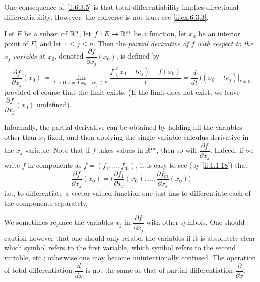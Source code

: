 \begin{rmk}\label{ii:6.3.6}
  One consequence of \cref{ii:6.3.5} is that total differentiability implies directional differentiability.
  However, the converse is not true;
  see \cref{ii:ex:6.3.3}.
\end{rmk}

\begin{defn}\label{ii:6.3.7}
  Let \(E\) be a subset of \(\mathbb{R}^n\), let \(f : E \to \mathbb{R}^m\) be a function, let \(x_0\) be an interior point of \(E\), and let \(1 \leq j \leq n\).
  Then the \emph{partial derivative of \(f\) with respect to the \(x_j\) variable} at \(x_0\), denoted \(\dfrac{\partial f}{\partial x_j}(x_0)\), is defined by
  \[
    \dfrac{\partial f}{\partial x_j}(x_0) \coloneqq \lim_{t \to 0 ; t \neq 0, x_0 + t e_j \in E} \dfrac{f(x_0 + t e_j) - f(x_0)}{t} = \dfrac{d}{dt} f(x_0 + t e_j)|_{t = 0}
  \]
  provided of course that the limit exists.
  (If the limit does not exist, we leave \(\dfrac{\partial f}{\partial x_j}(x_0)\) undefined).
\end{defn}

\begin{ac}\label{ii:ac:6.3.1}
  Informally, the partial derivative can be obtained by holding all the variables other than \(x_j\) fixed, and then applying the single-variable calculus derivative in the \(x_j\) variable.
  Note that if \(f\) takes values in \(\mathbb{R}^m\), then so will \(\dfrac{\partial f}{\partial x_j}\).
  Indeed, if we write \(f\) in components as \(f = (f_1, \dots, f_m)\), it is easy to see (by \cref{ii:1.1.18}) that
  \[
    \dfrac{\partial f}{\partial x_j}(x_0) = \bigg(\dfrac{\partial f_1}{\partial x_j}(x_0), \dots, \dfrac{\partial f_m}{\partial x_j}(x_0)\bigg)
  \]
  i.e., to differentiate a vector-valued function one just has to differentiate each of the components separately.
\end{ac}

\begin{note}
  We sometimes replace the variables \(x_j\) in \(\dfrac{\partial f}{\partial x_j}\) with other symbols.
  One should caution however that one should only relabel the variables if it is absolutely clear which symbol refers to the first variable, which symbol refers to the second variable, etc.;
  otherwise one may become unintentionally confused.
  The operation of total differentiation \(\dfrac{d}{dx}\) is not the same as that of partial differentiation \(\dfrac{\partial}{\partial x}\).
\end{note}

